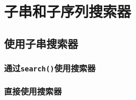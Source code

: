 \chapter{子串和子序列搜索器}\label{ch24}
\section{使用子串搜索器}
\subsection{通过\texttt{search()}使用搜索器}
\subsection{直接使用搜索器}\label{ch24.1.2}